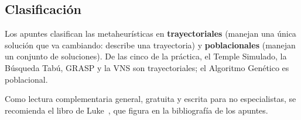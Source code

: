 \subsection{Clasificación}

Los apuntes clasifican las metaheurísticas en \textbf{trayectoriales} (manejan una única
solución que va cambiando: describe una trayectoria) y \textbf{poblacionales} (manejan un
conjunto de soluciones). De las cinco de la práctica, el Temple Simulado, la Búsqueda Tabú,
GRASP y la VNS son trayectoriales; el Algoritmo Genético es poblacional.

Como lectura complementaria general, gratuita y escrita para no especialistas, se recomienda
el libro de Luke~\cite{luke}, que figura en la bibliografía de los apuntes.
